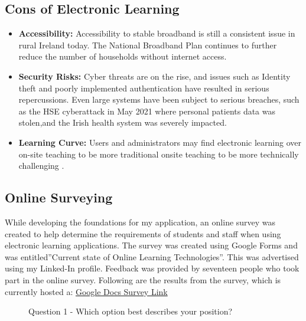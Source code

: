     \subsection{Cons of Electronic Learning}
    \begin{itemize}
    
    \item    \textbf{Accessibility:} Accessibility to stable broadband is still a consistent issue in rural Ireland today. The National Broadband Plan continues to  further reduce the number of households without internet access\cite{broadbandplan}. 

    
  \item   \textbf{Security Risks:} Cyber threats are on the rise, and issues such as Identity theft and poorly implemented authentication have resulted in serious repercussions. Even  large systems have been subject to serious breaches, such as the HSE cyberattack\cite{hsecyberattack} in May 2021 where personal patients data was stolen,and the Irish health system was severely impacted.
  
 
    \item    \textbf{Learning Curve:} Users and administrators  may find electronic learning over on-site teaching to be more traditional   onsite teaching to be more technically challenging .
  

\end{itemize}
    
    \subsection{Online Surveying}
 While developing the foundations for my application, an online survey was created to help determine the requirements of students and staff when using electronic learning applications. The survey was created using Google Forms and was entitled”Current state of Online Learning Technologies”. This was advertised using my Linked-In profile. Feedback was provided by seventeen people who took part in the online survey. Following are the results from the survey, which is currently hosted a:
  \href{ https://docs.google.com/forms/d/e/1FAIpQLSdHxmlGXDm7Yiyv7pxLluQw7-w5RMWtA-BsF0I0lPRX6kfU-Q/viewform}{Google Docs Survey Link}\cite{glink}


\begin{figure}[H]
  \centering
  \centering

       \caption{Question 1 - Which option best describes your position?
 }

\end{figure}



